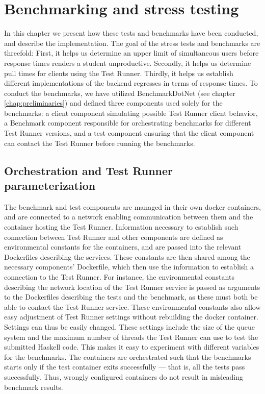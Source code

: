 \section{Benchmarking and stress testing} \label{chap:Benchmarking}
In this chapter we present how these tests and benchmarks have been conducted, and describe the implementation. 
The goal of the stress tests and benchmarks are threefold: 
First, it helps us determine an upper limit of simultaneous users before response times renders a student unproductive.
Secondly, it helps us determine pull times for clients using the Test Runner.
Thirdly, it helps us establish different implementations of the backend regresses in terms of response times.
To conduct the benchmarks, we have utilized BenchmarkDotNet (see chapter \ref{chap:preliminaries}) and defined three components used solely for the benchmarks:
a client component simulating possible Test Runner client behavior, a Benchmark component responsible for orchestrating benchmarks for different Test Runner versions, and a test component ensuring that the client component can contact the Test Runner before running the benchmarks.

\subsection{Orchestration and Test Runner parameterization}
The benchmark and test components are managed in their own docker containers, and are connected to a network enabling communication between them and the container hosting the Test Runner. 
Information necessary to establish such connection between Test Runner and other components are defined as environmental constants for the containers, and are passed into the relevant Dockerfiles describing the services.
These constants are then shared among the necessary components' Dockerfile, which then use the information to establish a connection to the Test Runner.
For instance, the environmental constants describing the network location of the Test Runner service is passed as arguments to the Dockerfiles describing the tests and the benchmark, as these must both be able to contact the Test Runner service.
These environmental constants also allow easy adjustment of Test Runner settings without rebuilding the docker container.
Settings can thus be easily changed.
These settings include the size of the queue system and the maximum number of threads the Test Runner can use to test the submitted Haskell code.
This makes it easy to experiment with different variables for the benchmarks.  
The containers are orchestrated such that the benchmarks starts only if the test container exits successfully --- that is, all the tests pass successfully. 
Thus, wrongly configured containers do not result in misleading benchmark results.

